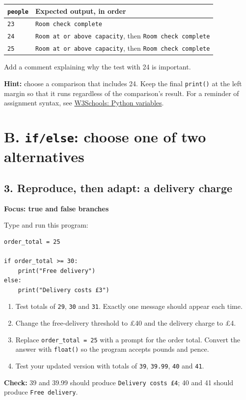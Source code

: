 \documentclass[12pt,a4paper]{article}
\begin{document}
\begingroup\small\renewcommand{\arraystretch}{1.3}\begin{longtable}{>{\raggedright\arraybackslash}p{}>{\raggedright\arraybackslash}p{}}
\toprule
\rowcolor{panel} \texttt{people} & Expected output, in order \\ \midrule\endhead
\texttt{23} & \texttt{Room check complete} \\
\texttt{24} & \texttt{Room at or above capacity}, then \texttt{Room check complete} \\
\texttt{25} & \texttt{Room at or above capacity}, then \texttt{Room check complete} \\
\bottomrule\end{longtable}\endgroup
Add a comment explaining why the test with 24 is important.

\textbf{Hint:} choose a comparison that includes 24. Keep the final \texttt{print()} at the left margin so that it runs regardless of the comparison's result. For a reminder of assignment syntax, see \href{https://www.w3schools.com/python/python_variables.asp}{W3Schools: Python variables}.

\section*{B. \texttt{if/else}: choose one of two alternatives}
\subsection*{3. Reproduce, then adapt: a delivery charge}
\textbf{Focus: true and false branches}

Type and run this program:

\begin{minipage}{\linewidth}
\begin{lstlisting}
order_total = 25

if order_total >= 30:
    print("Free delivery")
else:
    print("Delivery costs £3")
\end{lstlisting}
\end{minipage}
\par
\begin{enumerate}
\item Test totals of \texttt{29}, \texttt{30} and \texttt{31}. Exactly one message should appear each time.
\item Change the free-delivery threshold to £40 and the delivery charge to £4.
\item Replace \texttt{order\_total = 25} with a prompt for the order total. Convert the answer with \texttt{float()} so the program accepts pounds and pence.
\item Test your updated version with totals of \texttt{39}, \texttt{39.99}, \texttt{40} and \texttt{41}.
\end{enumerate}
\textbf{Check:} 39 and 39.99 should produce \texttt{Delivery costs £4}; 40 and 41 should produce \texttt{Free delivery}.
\end{document}
